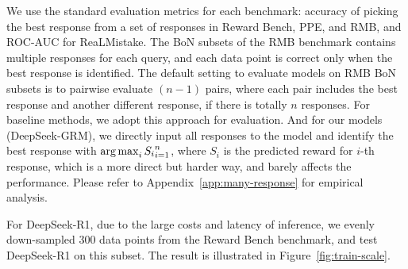 \documentclass{article} %
\newcommand{\SGRMAll}{DeepSeek-GRM\xspace}
\begin{document}
We use the standard evaluation metrics for each benchmark: accuracy of picking the best response from a set of responses in Reward Bench, PPE, and RMB, and ROC-AUC for ReaLMistake. The BoN subsets of the RMB benchmark contains multiple responses for each query, and each data point is correct only when the best response is identified. The default setting to evaluate models on RMB BoN subsets is to pairwise evaluate $(n-1)$ pairs, where each pair includes the best response and another different response, if there is totally $n$ responses. For baseline methods, we adopt this approach for evaluation. And for our models (\SGRMAll), we directly input all responses to the model and identify the best response with $\operatorname*{arg\,max}_{i} {S_i}_{i=1}^n$, where $S_i$ is the predicted reward for $i$-th response, which is a more direct but harder way, and barely affects the performance. Please refer to Appendix~\ref{app:many-response} for empirical analysis. 

For DeepSeek-R1, due to the large costs and latency of inference, we evenly down-sampled 300 data points from the Reward Bench benchmark, and test DeepSeek-R1 on this subset. The result is illustrated in Figure~\ref{fig:train-scale}. 

\end{document}
